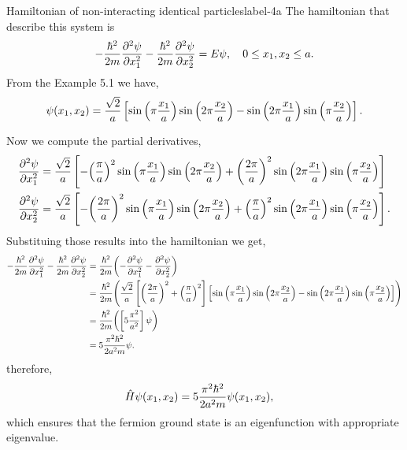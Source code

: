 \documentclass[../main.tex]{subfiles}
\begin{document}
\begin{sol}{Hamiltonian of non-interacting identical particles}{label-4a}
    The hamiltonian that describe this system is 
    \begin{gather*}
        -\frac{\hbar^2}{2m}\pdv[2]{\psi}{x_1}-\frac{\hbar^2}{2m}\pdv[2]{\psi}{x_2} = E\psi,\quad 0\leq x_1,x_2\leq a.
    \end{gather*}
    From the Example 5.1 we have,
    \begin{gather*}
        \psi\qty(x_1,x_2) = \frac{\sqrt{2}}{a}\left[ \sin\qty(\pi\frac{x_1}{a})\sin\qty(2\pi\frac{x_2}{a}) - \sin\qty(2\pi\frac{x_1}{a})\sin\qty(\pi\frac{x_2}{a})\right].
    \end{gather*}

    Now we compute the partial derivatives,
    \begin{align*}
        \pdv[2]{\psi}{x_1} &= \frac{\sqrt{2}}{a}\left[
                                    -\qty(\frac{\pi}{a})^2\sin\qty(\pi\frac{x_1}{a})\sin\qty(2\pi\frac{x_2}{a}) 
                                    + \qty(\frac{2\pi}{a})^2\sin\qty(2\pi\frac{x_1}{a})\sin\qty(\pi\frac{x_2}{a})
                                \right] \\
        \pdv[2]{\psi}{x_2} &= \frac{\sqrt{2}}{a}\left[
                                    -\qty(\frac{2\pi}{a})^2\sin\qty(\pi\frac{x_1}{a})\sin\qty(2\pi\frac{x_2}{a}) 
                                    + \qty(\frac{\pi}{a})^2\sin\qty(2\pi\frac{x_1}{a})\sin\qty(\pi\frac{x_2}{a})
                                \right].
    \end{align*}
    Substituing those results into the hamiltonian we get,
    \begin{align*}
        -\frac{\hbar^2}{2m}\pdv[2]{\psi}{x_1}-\frac{\hbar^2}{2m}\pdv[2]{\psi}{x_2} &= \frac{\hbar^2}{2m}\qty(-\pdv[2]{\psi}{x_1}-\pdv[2]{\psi}{x_2}) \\
                                                                             &= \frac{\hbar^2}{2m}\qty(\frac{\sqrt{2}}{a}\left[\qty(\frac{2\pi}{a})^2+\qty(\frac{\pi}{a})^2\right]\left[\sin\qty(\pi\frac{x_1}{a})\sin\qty(2\pi\frac{x_2}{a}) - \sin\qty(2\pi\frac{x_1}{a})\sin\qty(\pi\frac{x_2}{a})\right]) \\
                                                                             &= \frac{\hbar^2}{2m}\qty(\left[5\frac{\pi^2}{a^2}\right]\psi) \\
                                                                             &= 5\frac{\pi^2\hbar^2}{2a^2m}\psi.
    \end{align*}
    therefore,
    \begin{align*}
        \hat{H}\psi\qty(x_1,x_2)&=5\frac{\pi^2\hbar^2}{2a^2m}\psi\qty(x_1,x_2),
    \end{align*}
    which ensures that the fermion ground state is an eigenfunction with appropriate eigenvalue.


\end{sol}
\end{document}
